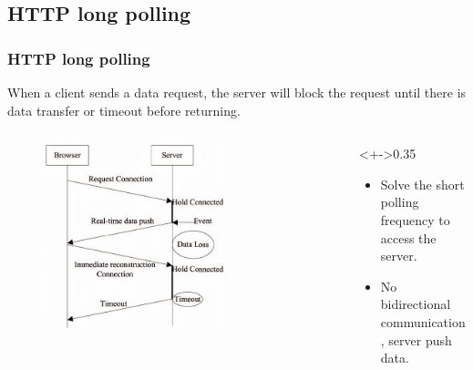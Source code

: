 \documentclass{beamer}
\begin{document}
\subsection{HTTP long polling}
\begin{frame}
    \frametitle{HTTP long polling}
    When a client sends a data request, the server will block the request until there is data transfer or timeout before returning.
    \begin{columns}
        \begin{column}{0.7\textwidth}
            \begin{figure}
                \includegraphics[width=0.7\textwidth]{images/long_polling.jpeg}
            \end{figure}
        \end{column}
        \begin{column}<+->{0.35\textwidth}
            \begin{itemize}[<+->]
                \item {\color{green} Solve the short polling frequency to access the server.}
                \item \alert{No bidirectional communication}, server push data.
            \end{itemize}
        \end{column}
    \end{columns}
\end{frame}
\end{document}
